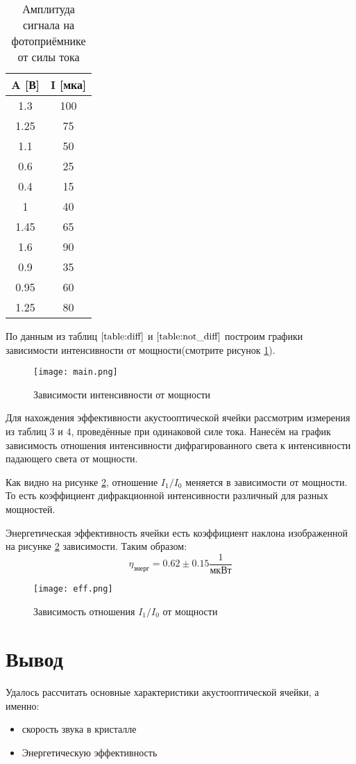 \documentclass[a4paper, 12pt]{extarticle}
\begin{document}
\begin{table}[hbtp]
    \centering
\begin{tabular}{|c|c|}
    \hline
A [В]&I [мка]\\
\hline

1.3&100\\
1.25&75\\
1.1&50\\
0.6&25\\
0.4&15\\
1&40\\
1.45&65\\
1.6&90\\
0.9&35\\
0.95&60\\
1.25&80\\

\hline
\end{tabular}
\label{table:not_diff}
\caption{Амплитуда сигнала на фотоприёмнике от силы тока}
\end{table}

По данным из таблиц $\ref{table:diff}$ и $\ref{table:not_diff}$ 
построим графики зависимости интенсивности от мощности(смотрите рисунок \ref{fig:intensuty}).

\begin{figure}[htbp]
    \centering
    \texttt{[image: main.png]}
    \caption{Зависимости интенсивности от мощности}
    \label{fig:intensuty}
\end{figure}

Для нахождения эффективности акустооптической ячейки рассмотрим измерения из таблиц 3 и 4, проведённые при одинаковой силе тока. 
Нанесём на график зависимость отношения интенсивности дифрагированного света к интенсивности падающего света от мощности.

Как видно на рисунке \ref{fig:eff}, отношение $I_{1} / I_{0}$ меняется в зависимости от мощности. То есть коэффициент дифракционной интенсивности различный для разных мощностей. 

Энергетическая эффективность ячейки есть коэффициент наклона изображенной на рисунке \ref{fig:eff} зависимости. Таким образом:
$$
\eta_{\text{энерг}} = 0.62 \pm 0.15 \frac{1}{\text{мкВт}}
$$

\begin{figure}[htbp]
    \centering
    \texttt{[image: eff.png]}
    \caption{Зависимость отношения $I_{1} / I_0$ от мощности}
    \label{fig:eff}
\end{figure}

\section*{\textcolor{header}{Вывод}}
Удалось рассчитать основные характеристики акустооптической ячейки, а именно:
\begin{itemize}
    \item скорость звука в кристалле
    \item Энергетическую эффективность
\end{itemize}
\end{document}
